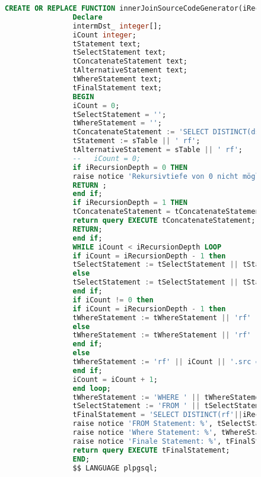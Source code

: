 \documentclass[a4paper,landscape]{scrartcl}
\begin{document}
        \begin{figure}
            \centering
            \begin{lstlisting}[language=SQL,caption = innerJoinSourceCodeGenerator,frame=single]
                CREATE OR REPLACE FUNCTION innerJoinSourceCodeGenerator(iRecursionDepth integer, sTable text) RETURNS SETOF integer AS $$
                Declare
                intermDst_ integer[];
                iCount integer;
                tStatement text;
                tSelectStatement text;
                tConcatenateStatement text;
                tAlternativeStatement text;
                tWhereStatement text;
                tFinalStatement text;
                BEGIN
                iCount = 0;
                tSelectStatement = '';
                tWhereStatement = '';
                tConcatenateStatement := 'SELECT DISTINCT(dst) FROM ' || sTable || ' WHERE src IN(';
                tStatement := sTable || ' rf';
                tAlternativeStatement = sTable || ' rf';
                --   iCount = 0;
                if iRecursionDepth = 0 THEN
                raise notice 'Rekursivtiefe von 0 nicht möglich';
                RETURN ;
                end if;
                if iRecursionDepth = 1 THEN
                tConcatenateStatement = tConcatenateStatement || '765' || ')';
                return query EXECUTE tConcatenateStatement;
                RETURN;
                end if;
                WHILE iCount < iRecursionDepth LOOP
                if iCount = iRecursionDepth - 1 then
                tSelectStatement := tSelectStatement || tStatement  || iCount || ' ';
                else
                tSelectStatement := tSelectStatement || tStatement  || iCount || ', ';
                end if;
                if iCount != 0 then
                if iCount = iRecursionDepth - 1 then
                tWhereStatement := tWhereStatement || 'rf' || iCount || '.src = rf' || iCount - 1 || '.dst ';
                else
                tWhereStatement := tWhereStatement || 'rf' || iCount || '.src = rf' || iCount - 1 || '.dst AND ';
                end if;
                else
                tWhereStatement := 'rf' || iCount || '.src = 765 AND ' ;
                end if;
                iCount = iCount + 1;
                end loop;
                tWhereStatement := 'WHERE ' || tWhereStatement;
                tSelectStatement := 'FROM ' || tSelectStatement;
                tFinalStatement = 'SELECT DISTINCT(rf'||iRecursionDepth - 1 || '.dst) ' || tSelectStatement || tWhereStatement;
                raise notice 'FROM Statement: %', tSelectStatement;
                raise notice 'Where Statement: %', tWhereStatement;
                raise notice 'Finale Statement: %', tFinalStatement;
                return query EXECUTE tFinalStatement;
                END;
                $$ LANGUAGE plpgsql;
            \end{lstlisting}
        \end{figure}
\end{document}
